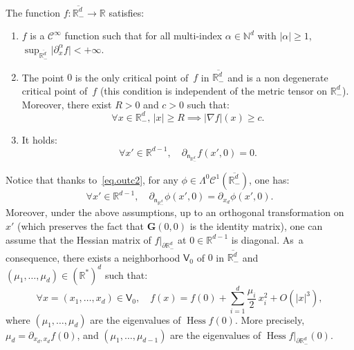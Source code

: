 \documentclass[10pt]{amsart}
\newenvironment{enumeratei}
{\bgroup\def\theenumi{\roman{enumi}}\def\theenumii{\arabic{enumii}}\begin{enumerate}}
{\end{enumerate}\egroup}
\newcommand{\mbf}[1]{\mathbf{#1}}
\let\pa\partial
\DeclareMathOperator{\hess}{Hess}\let\Hess\hess
\theoremstyle{plain}
\theoremstyle{definition}
\newenvironment{manualassumption}[1]{%
\renewcommand\themanualassumptioninner{#1}%
\manualassumptioninner}{\endmanualassumptioninner}
\begin{document}
\begin{manualassumption}{$(\textup{Potential-}\mathbb R^{d}_-)$}\label{PotentialRd-}
The function $f:\overline{\mathbb R^{d}_-}\to \mathbb R$ satisfies: \begin{enumeratei}
\item\label{PotentialRd-i}
$f$ is a $\mathcal C^\infty$ function such that for all multi-index $\alpha \in \mathbb N^d$ with $\vert \alpha\vert \ge 1$, $\sup_{\overline{\mathbb R^d_-}}\vert \partial_x^\alpha f\vert<+\infty$.
\item\label{PotentialRd-ii}
The point $0$ is the only critical point of~$f$ in $\overline{\mathbb R^d_-}$ and is a non degenerate critical point of~$f$ (this condition is independent of the metric tensor on $\mathbb R^{d}_-$). Moreover, there exist $R>0$ and $c>0$ such that:
\begin{equation}\label{eq.grad>0}
\forall x \in \mathbb R^d_-, \, \vert x \vert \ge R \implies \vert \nabla f\vert (x)\ge c.
\end{equation}

\item\label{PotentialRd-iii}
It holds:
\begin{equation}\label{eq.stable}
\forall x'\in \mathbb R^{d-1}, \quad \partial_{\mathsf n_{\mathbb R^d_-}}f(x',0)=0.
\end{equation}
\end{enumeratei}
\end{manualassumption}

Notice that thanks to~\eqref{eq.outc2}, for any $\phi \in
\Lambda^0\mathcal C^1(\overline{\mathbb R^d_-})$, one has:
\begin{equation}\label{eq.dec-gradient-phi}
\forall x'\in \mathbb R^{d-1},\quad \partial_{\mathsf n_{\mathbb R_-^d} }\phi (x',0)=\partial_{x_d}\phi(x',0).
\end{equation}
Moreover, under the above assumptions, up to an orthogonal transformation
on $x'$ (which preserves the fact that $\mbf G(0,0)$ is the identity matrix), one can assume that the Hessian
matrix of $f|_{\pa \mathbb R^{d}_-}$ at $0\in \mathbb R^{d-1}$ is
diagonal. As~a consequence, there exists a neighborhood $\mathsf V_0$ of $0$ in $\overline{\mathbb R^d_-}$ and $(\mu_1,\ldots,\mu_{d})\in (\mathbb R^*)^d$ such that:
\begin{equation}\label{eq.decf}
\forall x=(x_1,\ldots,x_d)\in \mathsf V_0,\quad f(x)= f(0)+
\sum_{i=1}^d \frac{\mu_i}{2}\, x_i^2 +O(|x|^3),
\end{equation}
where $(\mu_1, \ldots, \mu_d)$ are the eigenvalues of $\hess
f(0)$. More precisely, $\mu_d=\partial_{x_d,x_d} f(0)$, and
$(\mu_1,\ldots,\mu_{d-1})$ are the eigenvalues of $\hess f|_{\pa \mathbb R^{d}_-}(0)$.
\end{document}
